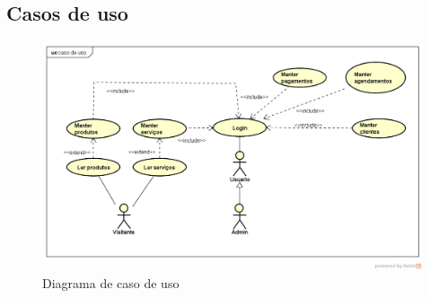 \subsection{Casos de uso}
\begin{figure}[H]
	\centering
	\includegraphics[width=1\linewidth]{imagens/casoDeUso}
	\caption[Diagrama de caso de uso]{Diagrama de caso de uso}
	\label{fig:fig1}
\end{figure}
